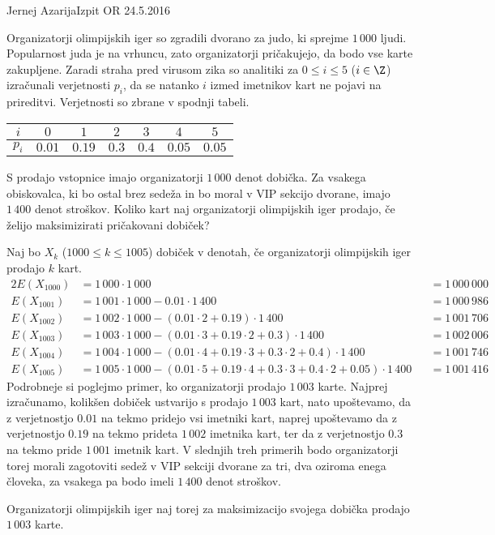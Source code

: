 \begin{naloga}{Jernej Azarija}{Izpit OR 24.5.2016}
\begin{vprasanje}
Organizatorji olimpijskih iger so zgradili dvorano za judo,
ki sprejme $1\,000$ ljudi.
Popularnost juda je na vrhuncu,
zato organizatorji pričakujejo, da bodo vse karte zakupljene.
Zaradi straha pred virusom zika so analitiki
za $0 \le i \le 5$ ($i \in \Z$) izračunali verjetnosti $p_i$,
da se natanko $i$ izmed imetnikov kart ne pojavi na prireditvi.
Verjetnosti so zbrane v spodnji tabeli.
\begin{center}
\begin{tabular}{c|cccccc}
$i$   & $0$    & $1$    & $2$   & $3$   & $4$    & $5$ \\ \hline
$p_i$ & $0.01$ & $0.19$ & $0.3$ & $0.4$ & $0.05$ & $0.05$
\end{tabular}
\end{center}

S prodajo vstopnice imajo organizatorji $1\,000$ denot dobička.
Za vsakega obiskovalca,
ki bo ostal brez sedeža in bo moral v VIP sekcijo dvorane,
imajo $1\,400$ denot stroškov.
Koliko kart naj organizatorji olimpijskih iger prodajo,
če želijo maksimizirati pričakovani dobiček?
\end{vprasanje}

\begin{odgovor}
Naj bo $X_k$ ($1000 \le k \le 1005$) dobiček v denotah,
če organizatorji olimpijskih iger prodajo $k$ kart.
\begin{alignat*}{2}
E(X_{1000}) &= 1\,000 \cdot 1\,000 &&= 1\,000\,000 \\
E(X_{1001}) &= 1\,001 \cdot 1\,000 - 0.01 \cdot 1\,400 &&= 1\,000\,986 \\
E(X_{1002}) &= 1\,002 \cdot 1\,000 - (0.01 \cdot 2 + 0.19) \cdot 1\,400
&&= 1\,001\,706 \\
E(X_{1003}) &= 1\,003 \cdot 1\,000 -
(0.01 \cdot 3 + 0.19 \cdot 2 + 0.3) \cdot 1\,400 &&= 1\,002\,006 \\
E(X_{1004}) &= 1\,004 \cdot 1\,000 -
(0.01 \cdot 4 + 0.19 \cdot 3 + 0.3 \cdot 2 + 0.4) \cdot 1\,400
&&= 1\,001\,746 \\
E(X_{1005}) &= 1\,005 \cdot 1\,000 -
(0.01 \cdot 5 + 0.19 \cdot 4 + 0.3 \cdot 3 + 0.4 \cdot 2 + 0.05) \cdot 1\,400
&&= 1\,001\,416
\end{alignat*}
Podrobneje si poglejmo primer, ko organizatorji prodajo $1\,003$ karte.
Najprej izračunamo, kolikšen dobiček ustvarijo s prodajo $1\,003$ kart,
nato upoštevamo,
da z ve\-rjet\-nost\-jo $0.01$ na tekmo pridejo vsi imetniki kart,
naprej upoštevamo da z ve\-rjet\-nost\-jo $0.19$
na tekmo prideta $1\,002$ imetnika kart,
ter da z ve\-rjet\-nost\-jo $0.3$ na tekmo pride $1\,001$ imetnik kart.
V slednjih treh primerih bodo organizatorji
torej morali zagotoviti sedež v VIP sekciji dvorane
za tri, dva oziroma enega človeka,
za vsakega pa bodo imeli $1\,400$ denot stroškov.

Organizatorji olimpijskih iger naj torej
za maksimizacijo svojega dobička prodajo $1\,003$ karte.
\end{odgovor}

\end{naloga}
